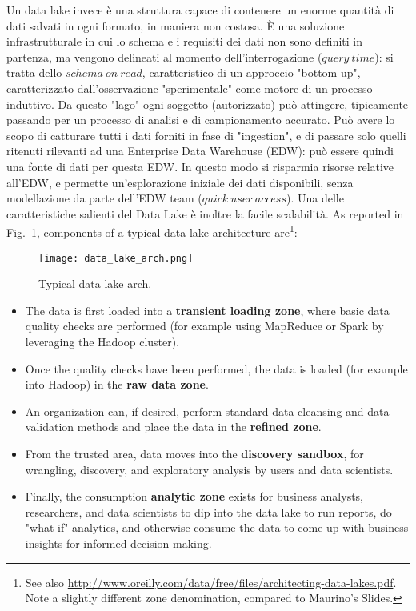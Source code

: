 \documentclass[a4page, 11pt]{article}
\begin{document}
Un data lake invece è una struttura capace di contenere un enorme quantità di dati salvati in ogni formato, in maniera non costosa.
\`E una soluzione infrastrutturale in cui lo schema e i requisiti dei dati non sono definiti in partenza, ma vengono delineati al momento dell'interrogazione ($query\ time$): si tratta dello $schema\ on\ read$, caratteristico di un approccio "bottom up", caratterizzato dall'osservazione "sperimentale" come motore di un processo induttivo. 
Da questo "lago" ogni soggetto (autorizzato) può attingere, tipicamente passando per un processo di analisi e di campionamento accurato. 
Può avere lo scopo di catturare tutti i dati forniti in fase di "ingestion", e di passare solo quelli ritenuti rilevanti ad una Enterprise Data Warehouse (EDW): può essere quindi una fonte di dati per questa EDW. In questo modo si risparmia risorse relative all'EDW, e permette un'esplorazione iniziale dei dati disponibili, senza modellazione da parte dell'EDW team ($quick\ user \ access$).
Una delle caratteristiche salienti del Data Lake è inoltre la facile scalabilità. 
As reported in Fig.~\ref{data_lake_arch:fig}, components of a typical data lake architecture are\footnote{See also \url{http://www.oreilly.com/data/free/files/architecting-data-lakes.pdf}. Note a slightly different zone denomination, compared to Maurino's Slides.}:

\begin{figure}
\centering
\texttt{[image: data\_lake\_arch.png]}
\caption{\label{data_lake_arch:fig} Typical data lake arch.
}
\end{figure}


\begin{itemize}
\item The data is first loaded into a \textbf{transient loading zone}, where basic data quality checks are performed (for example using MapReduce or Spark by leveraging the Hadoop cluster). 
\item Once the quality checks have been performed, the data is loaded (for example into Hadoop) in the \textbf{raw data zone}.

\item An organization can, if desired, perform standard data cleansing and data validation methods and place the data in the \textbf{refined zone}. 

\item From the trusted area, data moves into the \textbf{discovery sandbox}, for wrangling, discovery, and exploratory analysis by users and data scientists.

\item Finally, the consumption \textbf{analytic zone} exists for business analysts, researchers, and data scientists to dip into the data lake to run reports, do "what if" analytics, and otherwise consume the data to come up with business insights for informed decision-making.

\end{itemize}
\end{document}
